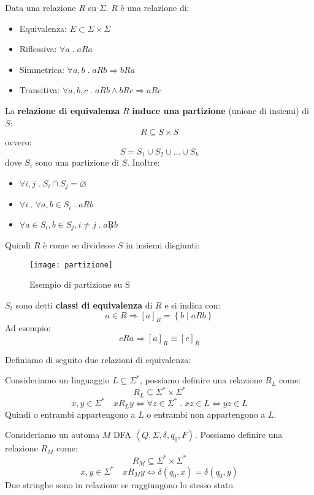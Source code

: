 \documentclass[a4paper]{article}
\begin{document}
\begin{definition}
  Data una relazione \( R \) su \( \Sigma \).
  \( R \) è una relazione di:
  \begin{itemize}
    \item Equivalenza: \( E \subset \Sigma \times \Sigma  \) 
    \item Riflessiva: \( \forall a \;.\; aRa \) 
    \item Simmetrica: \( \forall a,b \;.\; aRb \Rightarrow bRa \)
    \item Transitiva: \( \forall a,b,c \;.\; aRb \wedge bRc \Rightarrow aRc \)
  \end{itemize}
  La \textbf{relazione di equivalenza} \( R \) \textbf{induce una partizione} (unione di insiemi)
  di \( S \):
  \[
    R \subseteq S \times S
  \] 
  ovvero:
  \[
    S = S_1 \cup S_2 \cup \ldots \cup S_k
  \] 
  dove \( S_i \) sono una partizione di \( S \).
  Inoltre:
  \begin{itemize}
    \item \( \forall i,j \;.\; S_i \cap S_j = \varnothing \)
    \item \( \forall i \;.\; \forall a,b \in S_i \;.\; aRb \)
    \item \( \forall a \in S_i, b \in S_j, i \neq j \;.\; a \not R b \)
  \end{itemize}

  \vspace{1em}
  \noindent
  Quindi \( R \) è come se dividesse \( S \) in insiemi disgiunti:
  \begin{figure}[H]
    \centering
    \texttt{[image: partizione]}
    \caption{Esempio di partizione su S}
  \end{figure}
  \noindent
  \( S_i \) sono detti \textbf{classi di equivalenza} di \( R \) e si indica con:
  \[
    a \in R \Rightarrow [a]_R = \left\{ b \;\left|\; aRb \right. \right\}
  \] 
  Ad esempio:
  \[
    cRa \Rightarrow [a]_R \equiv [c]_R
  \] 
\end{definition}

\vspace{1em}
\noindent
Definiamo di seguito due relazioni di equivalenza:
\begin{definition}
  Consideriamo un linguaggio \( L \subseteq \Sigma^* \), possiamo definire una relazione
  \( R_L \) come:
  \[
    R_L \subseteq \Sigma^* \times \Sigma^*
  \] 
  \[
    x,y \in \Sigma^* \quad x R_L y \iff \forall z \in \Sigma^* \;.\; xz \in L \iff
    yz \in L
  \] 
  Quindi o entrambi appartengono a \( L \) o entrambi non appartengono a \( L \).
\end{definition}
\begin{definition}
  Consideriamo un automa \( M \) DFA \( \left< Q, \Sigma, \delta, q_0, F \right> \).
  Possiamo definire una relazione \( R_M \) come:
  \[
    R_M \subseteq \Sigma^* \times \Sigma^*
  \] 
  \[
    x,y \in \Sigma^* \quad x R_M y \iff \delta(q_0, x) = \delta(q_0, y)
  \] 
  Due stringhe sono in relazione se raggiungono lo stesso stato.
\end{definition}
\end{document}
